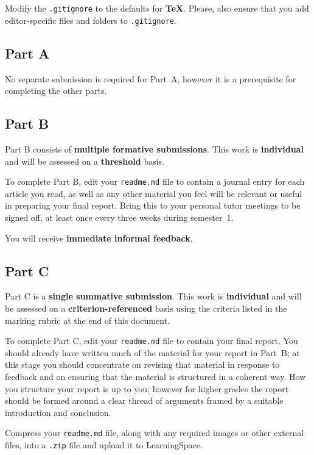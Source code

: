 \documentclass{../fal_assignment}
\begin{document}
Modify the \texttt{.gitignore} to the defaults for \textbf{TeX}. Please, also ensure that you add editor-specific files and folders to \texttt{.gitignore}. 

\subsection*{Part A}

No separate submission is required for Part~A, however it is a prerequisite for completing the other parts.

\subsection*{Part B}

Part B consists of \textbf{multiple formative submissions}. This work is \textbf{individual} and will be assessed on a \textbf{threshold} basis.

To complete Part B, edit your \texttt{readme.md} file to contain a journal entry for each article you read,
as well as any other material you feel will be relevant or useful in preparing your final report.
Bring this to your personal tutor meetings to be signed off, at least once every three weeks during semester~1.

You will receive \textbf{immediate informal feedback}.

\subsection*{Part C}

Part C is a \textbf{single summative submission}. This work is \textbf{individual} and will be assessed on a \textbf{criterion-referenced} basis
using the criteria listed in the marking rubric at the end of this document.

To complete Part C, edit your \texttt{readme.md} file to contain your final report.
You should already have written much of the material for your report in Part~B;
at this stage you should concentrate on revising that material in response to feedback
and on ensuring that the material is structured in a coherent way.
How you structure your report is up to you;
however for higher grades the report should be formed around a clear thread of arguments framed by a suitable introduction and conclusion.

Compress your \texttt{readme.md} file, along with any required images or other external files,
into a \texttt{.zip} file and upload it to LearningSpace.
\end{document}
